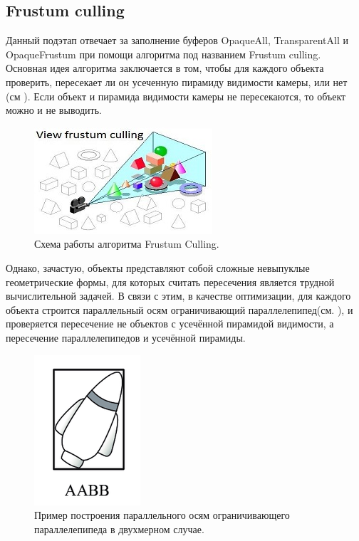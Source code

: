 	\subsection{Frustum culling} \label{ch3:pre_pass:frustum}
		Данный подэтап отвечает за заполнение буферов OpaqueAll, TransparentAll и OpaqueFrustum при помощи алгоритма под названием Frustum culling\cite{assarsson2000optimized}. Основная идея алгоритма заключается в том, чтобы для каждого объекта проверить, пересекает ли он усеченную пирамиду видимости камеры, или нет (см ). Если объект и пирамида видимости камеры не пересекаются, то объект можно и не выводить.
		\begin{figure}[ht!] 
			\center
			\includegraphics [scale=1] {my_folder/images//frustum_culling}	
			\caption{Схема работы алгоритма Frustum Culling.} 
			\label{fig:frustum_culling}
		\end{figure}
		
		Однако, зачастую, объекты представляют собой сложные невыпуклые геометрические формы, для которых считать пересечения является трудной вычислительной задачей. В связи с этим, в качестве оптимизации, для каждого объекта строится параллельный осям ограничивающий параллелепипед(см. ), и проверяется пересечение не объектов с усечённой пирамидой видимости, а пересечение параллелепипедов и усечённой пирамиды. 
		
		\begin{figure}[ht!] 
			\center
			\includegraphics [scale=0.8] {my_folder/images//aabb}	
			\caption{Пример построения параллельного осям ограничивающего параллелепипеда в двухмерном случае.} 
			\label{fig:aabb}
		\end{figure}
		
